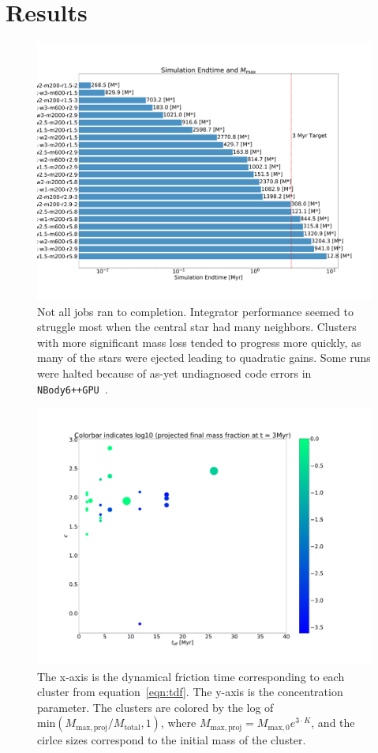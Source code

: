 \documentclass{princeton_astro_thesis}
\newcommand\nbody{\texttt{NBody6++GPU }}
\numberwithin{equation}{section}
\begin{document}
\chapter{Results} \label{ch:Results}

\begin{figure}
    \centering
    \includegraphics{JobProgress}
    \caption{Not all jobs ran to completion. Integrator performance seemed to struggle most when the central star had many neighbors.  Clusters with more significant mass loss tended to progress more quickly, as many of the stars were ejected leading to quadratic gains.  Some runs were halted because of as-yet undiagnosed code errors in \nbody.}
    \label{fig:JobProgress}
\end{figure}

\begin{figure}
    \centering
    \includegraphics[width=1.3\textwidth]{kplot}
    \caption{The x-axis is the dynamical friction time corresponding to each cluster from equation~\ref{eqn:tdf}.  The y-axis is the concentration parameter.  The clusters are colored by the log of $\mathrm{min}(M_{\mathrm{max, proj}}/M_{\mathrm{total}}, 1)$, where $M_{\mathrm{max, proj}} = M_{\mathrm{max}, 0}e^{3 \cdot K}$, and the cirlce sizes correspond to the initial mass of the cluster.}
    \label{fig:Kplot}
\end{figure}
\end{document}
